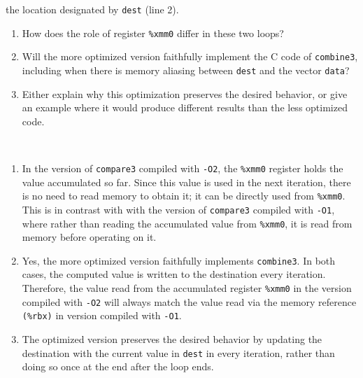 \documentclass[12pt]{article}
\newenvironment{ex}[2][Exercise]{\begin{trivlist}
		\item[\hskip \labelsep {\bfseries #1}\hskip \labelsep {\bfseries #2.}]}{\end{trivlist}}
\newenvironment{sol}[1][Solution]{\begin{trivlist}
		\item[\hskip \labelsep {\bfseries #1:}]}{\end{trivlist}}
\begin{document}
\begin{ex}{5.4}
	the location designated by \texttt{dest} (line 2).
	\begin{enumerate}[label=(\alph*)]
		\item How does the role of register \texttt{\%xmm0} differ in these two loops?
		\item Will the more optimized version faithfully implement the C code of \texttt{combine3},
		including when there is memory aliasing between \texttt{dest} and the vector
		\texttt{data}?
		\item Either explain why this optimization preserves the desired behavior, or give an
		example where it would produce different results than the less optimized code.
	\end{enumerate}
\end{ex}

\begin{sol}
	\
	\begin{enumerate}[label=(\alph*)]
		\item In the version of \texttt{compare3} compiled with \texttt{-O2}, the \texttt{\%xmm0}
		register holds the value accumulated so far. Since this value is used in the next iteration,
		there is no need to read memory to obtain it; it can be directly used from \texttt{\%xmm0}.
		This is in contrast with with the version of \texttt{compare3} compiled with \texttt{-O1},
		where rather than reading the accumulated value from \texttt{\%xmm0}, it is read from
		memory before operating on it.
		\item Yes, the more optimized version faithfully implements \texttt{combine3}.
		In both cases, the computed value is written to the destination every iteration.
		Therefore, the value read from the accumulated register \texttt{\%xmm0} in the version
		compiled with \texttt{-O2} will always match the value read via the memory reference
		\texttt{(\%rbx)} in version compiled with \texttt{-O1}.
		\item The optimized version preserves the desired behavior by updating the destination
		with the current value in \texttt{dest} in every iteration, rather than doing so
		once at the end after the loop ends.
	\end{enumerate}
\end{sol}
\end{document}
